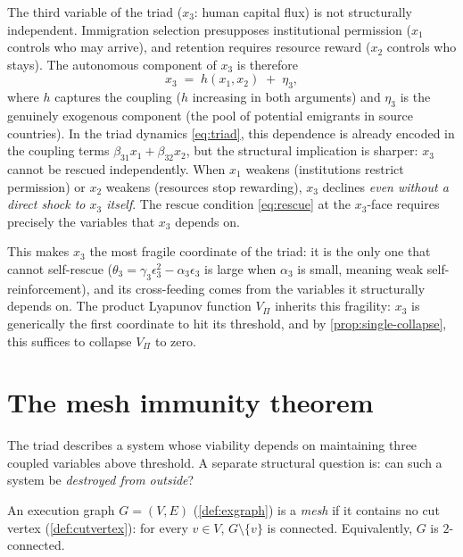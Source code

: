 \begin{remark}\label{rem:dependent}
The third variable of the triad ($x_3$: human capital flux) is
not structurally independent.  Immigration selection presupposes
institutional permission ($x_1$ controls who may arrive), and
retention requires resource reward ($x_2$ controls who stays).
The autonomous component of $x_3$ is therefore
\[
  x_3 \;=\; h(x_1, x_2) \;+\; \eta_3,
\]
where $h$ captures the coupling ($h$ increasing in both arguments)
and $\eta_3$ is the genuinely exogenous component (the pool of
potential emigrants in source countries).  In the triad dynamics
\eqref{eq:triad}, this dependence is already encoded in the
coupling terms $\beta_{31} x_1 + \beta_{32} x_2$, but the
structural implication is sharper: $x_3$ cannot be rescued
independently.  When $x_1$ weakens (institutions restrict
permission) or $x_2$ weakens (resources stop rewarding), $x_3$
declines \emph{even without a direct shock to $x_3$ itself}.
The rescue condition \eqref{eq:rescue} at the $x_3$-face
requires precisely the variables that $x_3$ depends on.

This makes $x_3$ the most fragile coordinate of the triad:
it is the only one that cannot self-rescue
($\theta_3 = \gamma_3 \epsilon_3^2 - \alpha_3 \epsilon_3$
is large when $\alpha_3$ is small, meaning weak
self-reinforcement), and its cross-feeding comes from the
variables it structurally depends on.  The product Lyapunov
function $V_\Pi$ inherits this fragility: $x_3$ is generically
the first coordinate to hit its threshold, and by
\cref{prop:single-collapse}, this suffices to collapse
$V_\Pi$ to zero.
\end{remark}

\section{The mesh immunity theorem}\label{sec:mesh}

The triad describes a system whose viability depends on
maintaining three coupled variables above threshold.
A separate structural question is: can such a system be
\emph{destroyed from outside}?

\begin{definition}\label{def:mesh}
An execution graph $G = (V, E)$ (\cref{def:exgraph}) is a
\emph{mesh} if it contains no cut vertex
(\cref{def:cutvertex}): for every $v \in V$,
$G \setminus \{v\}$ is connected.
Equivalently, $G$ is $2$-connected.
\end{definition}

